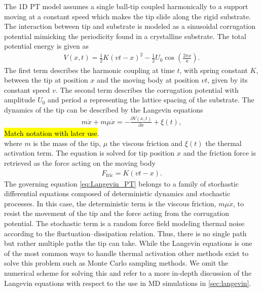 The 1D \acrshort{PT} model assumes a single ball-tip coupled harmonically to a support moving at a constant speed which makes the tip slide along the rigid substrate. The interaction between tip and substrate is modeled as a sinusoidal corrugation potential mimicking the periodicity found in a crystalline substrate. The total potential energy is given as
\begin{align}
  V(x,t) = \frac{1}{2}K(vt - x)^2 - \frac{1}{2}U_0 \cos \left(\frac{2\pi x}{a} \right).
  \label{eq:V_PT}
\end{align}
The first term describes the harmonic coupling at time $t$, with spring constant $K$, between the tip at position $x$ and the moving body at position $vt$, given by its constant speed $v$. The second term describes the corrugation potential with amplitude $U_0$ and period $a$ representing the lattice spacing of the substrate. The dynamics of the tip can be described by the Langevin equations 
\begin{align}
  m \ddot{x}+m \mu \dot{x}=-\frac{\partial V(x, t)}{\partial x}+\xi(t),
  \label{eq:Langevin_PT}
\end{align}
\hl{Match notation with later use}. \\
where $m$ is the mass of the tip, $\mu$ the viscous friction and $\xi(t)$ the thermal activation term. The equation is solved for tip position $x$ and the friction force is retrieved as the force acting on the moving body
\begin{align*}
  F_{\text{fric}} = K(vt - x).
\end{align*}
The governing equation \cref{eq:Langevin_PT} belongs to a family of stochastic differential equations composed of deterministic dynamics and stochastic processes. In this case, the deterministic term is the viscous friction, $m\mu\dot{x}$, to resist the movement of the tip and the force acting from the corrugation potential. The stochastic term is a random force field modeling thermal noise according to the fluctuation–dissipation relation. Thus, there is no single path but rather multiple paths the tip can take. While the Langevin equations is one of the most common ways to handle thermal activation other methods exist to solve this problem such as Monte Carlo sampling methods. We omit the numerical scheme for solving this and refer to a more in-depth discussion of the Langevin equations with respect to the use in \acrshort{MD} simulations in \cref{sec:langevin}. 


